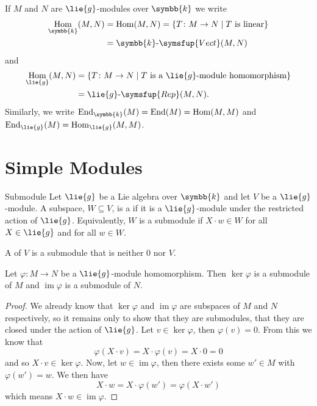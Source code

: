 \documentclass[fleqn]{NotesClass}
\makeatletter
\renewcommand{\field}{\symbb{k}}
\newcommand{\c@egory}[1]{\symsfup{#1}}
\newcommand{\Vect}[1][\field]{#1\text{-}\c@egory{Vect}}
\newcommand{\Rep}[1][\lie{g}]{#1\text{-}\c@egory{Rep}}
\DeclareMathOperator{\Hom}{Hom}
\DeclareMathOperator{\End}{End}
\DeclareMathOperator{\im}{im}
\makeatother
\begin{document}
    \begin{ntn}{}{}
        If \(M\) and \(N\) are \(\lie{g}\)-modules over \(\field\) we write
        \begin{align}
            \Hom_{\field}(M, N) &= \Hom(M, N) = \{T \colon M \to N \mid T \text{ is linear}\}\\
            &= \Vect(M, N)
        \end{align}
        and
        \begin{align}
            \Hom_{\lie{g}}(M, N) &= \{T \colon M \to N \mid T \text{ is a } \lie{g} \text{-module homomorphism}\}\\
            &= \Rep(M, N).
        \end{align}
        Similarly, we write \(\End_{\field}(M) = \End(M) = \Hom(M, M)\) and \(\End_{\lie{g}}(M) = \Hom_{\lie{g}}(M, M)\).
    \end{ntn}
    
    \section{Simple Modules}
    \begin{dfn}{Submodule}{}
        Let \(\lie{g}\) be a Lie algebra over \(\field\) and let \(V\) be a \(\lie{g}\)-module.
        A subspace, \(W \subseteq V\), is a  if it is a \(\lie{g}\)-module under the restricted action of \(\lie{g}\).
        Equivalently, \(W\) is a submodule if \(X \cdot w \in W\) for all \(X \in \lie{g}\) and for all \(w \in W\).
        
        A  of \(V\) is a submodule that is neither \(0\) nor \(V\).
    \end{dfn}
    
    \begin{lma}{}{}
        Let \(\varphi \colon M \to N\) be a \(\lie{g}\)-module homomorphism.
        Then \(\ker \varphi\) is a submodule of \(M\) and \(\im \varphi\) is a submodule of \(N\).
        \begin{proof}
            We already know that \(\ker \varphi\) and \(\im \varphi\) are subspaces of \(M\) and \(N\) respectively, so it remains only to show that they are submodules, that they are closed under the action of \(\lie{g}\).
            Let \(v \in \ker \varphi\), then \(\varphi(v) = 0\).
            From this we know that
            \begin{equation}
                \varphi(X \cdot v) = X \cdot \varphi(v) = X \cdot 0 = 0
            \end{equation}
            and so \(X \cdot v \in \ker \varphi\).
            Now, let \(w \in \im \varphi\), then there exists some \(w' \in M\) with \(\varphi(w') = w\).
            We then have
            \begin{equation}
                X \cdot w = X \cdot \varphi(w') = \varphi(X \cdot w')
            \end{equation}
            which means \(X \cdot w \in \im \varphi\).
        \end{proof}
    \end{lma}
    
\end{document}
